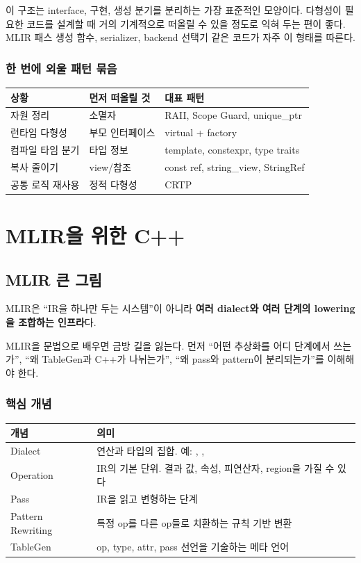 \documentclass[11pt,a4paper]{book}
\DeclareRobustCommand{\code}[1]{\texttt{\detokenize{#1}}}
\newcommand{\term}[1]{\textbf{#1}}
\begin{document}
이 구조는 interface, 구현, 생성 분기를 분리하는 가장 표준적인 모양이다. 다형성이 필요한 코드를 설계할 때 거의 기계적으로 떠올릴 수 있을 정도로 익혀 두는 편이 좋다. MLIR 패스 생성 함수, serializer, backend 선택기 같은 코드가 자주 이 형태를 따른다.

\section{한 번에 외울 패턴 묶음}

\begin{longtable}{p{}p{}p{}}
\toprule
상황 & 먼저 떠올릴 것 & 대표 패턴 \\
\midrule
\endhead
자원 정리 & 소멸자 & RAII, Scope Guard, unique\_ptr \\
런타임 다형성 & 부모 인터페이스 & virtual + factory \\
컴파일 타임 분기 & 타입 정보 & template, constexpr, type traits \\
복사 줄이기 & view/참조 & const ref, string\_view, StringRef \\
공통 로직 재사용 & 정적 다형성 & CRTP \\
\bottomrule
\end{longtable}

\part{MLIR을 위한 C++}

\chapter{MLIR 큰 그림}

MLIR은 ``IR을 하나만 두는 시스템''이 아니라 \term{여러 dialect와 여러 단계의 lowering을 조합하는 인프라}다.

\begin{conceptbox}[title={이 파트에서 얻어야 할 감각}]
MLIR을 문법으로 배우면 금방 길을 잃는다. 먼저 ``어떤 추상화를 어디 단계에서 쓰는가'', ``왜 TableGen과 C++가 나뉘는가'', ``왜 pass와 pattern이 분리되는가''를 이해해야 한다.
\end{conceptbox}

\section{핵심 개념}

\begin{longtable}{p{}p{}}
\toprule
개념 & 의미 \\
\midrule
\endhead
Dialect & 연산과 타입의 집합. 예: \code{func}, \code{arith}, \code{linalg} \\
Operation & IR의 기본 단위. 결과 값, 속성, 피연산자, region을 가질 수 있다 \\
Pass & IR을 읽고 변형하는 단계 \\
Pattern Rewriting & 특정 op를 다른 op들로 치환하는 규칙 기반 변환 \\
TableGen & op, type, attr, pass 선언을 기술하는 메타 언어 \\
\bottomrule
\end{longtable}
\end{document}

